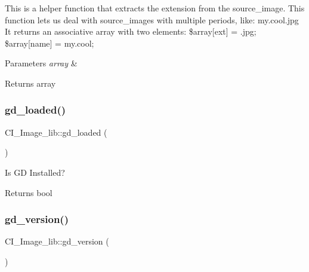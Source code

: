 This is a helper function that extracts the extension from the source\+\_\+image. This function lets us deal with source\+\_\+images with multiple periods, like\+: my.\+cool.\+jpg It returns an associative array with two elements\+: \$array\mbox{[}\textquotesingle{}ext\textquotesingle{}\mbox{]} = \textquotesingle{}.jpg\textquotesingle{}; \$array\mbox{[}\textquotesingle{}name\textquotesingle{}\mbox{]} = \textquotesingle{}my.\+cool\textquotesingle{};


\begin{DoxyParams}{Parameters}
{\em array} & \\
\hline
\end{DoxyParams}
\begin{DoxyReturn}{Returns}
array 
\end{DoxyReturn}
\mbox{\label{class_c_i___image__lib_a78bedde7e345af68b6ec3c21764d5d54}} 
\subsubsection{\texorpdfstring{gd\+\_\+loaded()}{gd\_loaded()}}
{\footnotesize\ttfamily C\+I\+\_\+\+Image\+\_\+lib\+::gd\+\_\+loaded (\begin{DoxyParamCaption}{ }\end{DoxyParamCaption})}

Is GD Installed?

\begin{DoxyReturn}{Returns}
bool 
\end{DoxyReturn}
\mbox{\label{class_c_i___image__lib_ad8ddaa5bc63d935f05a7dba5330c2c14}} 
\subsubsection{\texorpdfstring{gd\+\_\+version()}{gd\_version()}}
{\footnotesize\ttfamily C\+I\+\_\+\+Image\+\_\+lib\+::gd\+\_\+version (\begin{DoxyParamCaption}{ }\end{DoxyParamCaption})}

